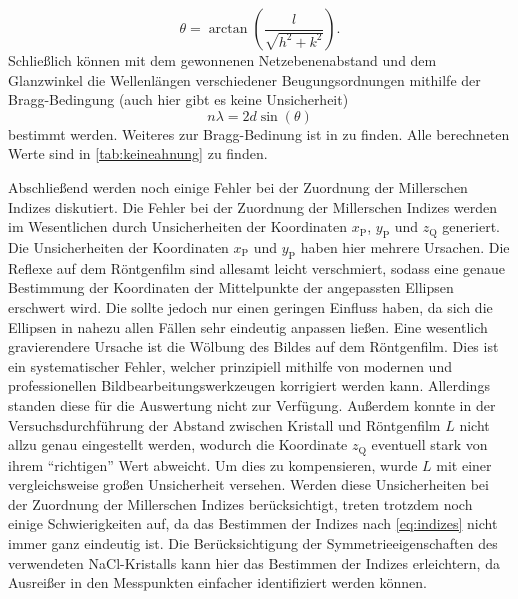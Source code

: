\begin{equation*}
    \theta = \arctan(\frac{l}{\sqrt{h^2 + k^2}}) .
\end{equation*} Schließlich können mit dem gewonnenen Netzebenenabstand und dem Glanzwinkel die Wellenlängen verschiedener Beugungsordnungen mithilfe
der Bragg-Bedingung (auch hier gibt es keine Unsicherheit)
\begin{equation*}
    n \lambda = 2d \sin(\theta)
\end{equation*} bestimmt werden. Weiteres zur Bragg-Bedinung ist in \cite{demtröder} zu finden. Alle berechneten Werte sind in \cref{tab:keineahnung} zu finden.\par
Abschließend werden noch einige Fehler bei der Zuordnung der Millerschen Indizes diskutiert. Die Fehler bei der Zuordnung der Millerschen Indizes werden im Wesentlichen durch
Unsicherheiten der Koordinaten $x_{\mathrm{P}}$, $y_{\mathrm{P}}$ und $z_{\mathrm{Q}}$ generiert. Die Unsicherheiten der Koordinaten $x_{\mathrm{P}}$ und $y_{\mathrm{P}}$
haben hier mehrere Ursachen. Die Reflexe auf dem Röntgenfilm sind allesamt leicht verschmiert, sodass eine genaue Bestimmung der Koordinaten der Mittelpunkte
der angepassten Ellipsen erschwert wird. Die sollte jedoch nur einen geringen Einfluss haben, da sich die Ellipsen in nahezu allen Fällen sehr eindeutig anpassen ließen.
Eine wesentlich gravierendere Ursache ist die Wölbung des Bildes auf dem Röntgenfilm. Dies ist ein systematischer Fehler, welcher prinzipiell mithilfe von modernen
und professionellen Bildbearbeitungswerkzeugen korrigiert werden kann. Allerdings standen diese für die Auswertung nicht zur Verfügung.
Außerdem konnte in der Versuchsdurchführung der Abstand zwischen Kristall und Röntgenfilm $L$ nicht allzu genau eingestellt werden, wodurch
die Koordinate $z_{\mathrm{Q}}$ eventuell stark von ihrem \enquote{richtigen} Wert abweicht. Um dies zu kompensieren, wurde $L$ mit
einer vergleichsweise großen Unsicherheit versehen. Werden diese Unsicherheiten bei
der Zuordnung der Millerschen Indizes berücksichtigt, treten trotzdem noch einige Schwierigkeiten auf, da das Bestimmen der Indizes nach \cref{eq:indizes} nicht immer ganz eindeutig
ist. Die Berücksichtigung der Symmetrieeigenschaften des verwendeten NaCl-Kristalls kann hier das Bestimmen der Indizes erleichtern, da Ausreißer in den Messpunkten
einfacher identifiziert werden können.
